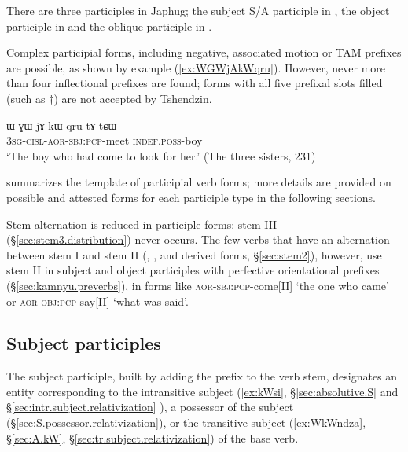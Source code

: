 There are three participles in Japhug; the subject S/A participle in , the object participle in  and the oblique participle in . 

Complex participial forms, including negative, associated motion or TAM prefixes are possible, as shown by example (\ref{ex:WGWjAkWqru}). However, never more than four inflectional prefixes are found; forms with all five prefixal slots filled (such as $\dagger$) are not accepted by Tshendzin.

 \begin{exe}
\ex \label{ex:WGWjAkWqru}
\gll ɯ-ɣɯ-jɤ-kɯ-qru tɤ-tɕɯ  \\
  \textsc{3sg}-\textsc{cisl}-\textsc{aor}-\textsc{sbj}:\textsc{pcp}-meet \textsc{indef}.\textsc{poss}-boy   \\
\glt `The boy who had come to look for her.' (The three sisters, 231)
 \end{exe}

 summarizes the template of participial verb forms; more details are provided on possible and attested forms for each participle type in the following sections.

\begin{table}[h]
\caption{The template of participial verb forms in Japhug} \centering \label{tab:template.nmlz}
\end{table}

Stem alternation is reduced in participle forms: stem III (§\ref{sec:stem3.distribution}) never occurs. The few verbs that have an alternation between stem I and stem II (, ,  and derived forms, §\ref{sec:stem2}), however, use stem II in subject and object participles with perfective orientational prefixes (§\ref{sec:kamnyu.preverbs}), in forms like  \textsc{aor}-\textsc{sbj}:\textsc{pcp}-come[II] `the one who came'
or  \textsc{aor}-\textsc{obj}:\textsc{pcp}-say[II] `what was said'.
 
\subsection{Subject participles} \label{sec:subject.participles}
The subject participle, built by adding the prefix  to the verb stem, designates an entity corresponding to the intransitive subject (\ref{ex:kWsi}, §\ref{sec:absolutive.S} and §\ref{sec:intr.subject.relativization} ), a possessor of the subject (§\ref{sec:S.possessor.relativization}), or the transitive subject (\ref{ex:WkWndza}, §\ref{sec:A.kW}, §\ref{sec:tr.subject.relativization}) of the base verb. 

